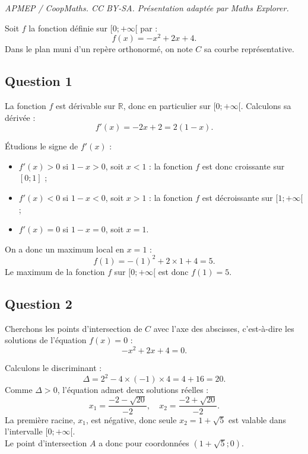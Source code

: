 \documentclass[10pt]{article}
\begin{document}
\noindent\textit{APMEP / CoopMaths. CC BY-SA. Présentation adaptée par Maths Explorer.}\par\medskip
Soit $f$ la fonction définie sur $[0 ; +\infty[$ par :
	\[
	f(x) = -x^2 + 2x + 4.
	\]
	Dans le plan muni d'un repère orthonormé, on note $C$ sa courbe représentative.
	
	\subsection*{Question 1}
	
	La fonction $f$ est dérivable sur $\mathbb{R}$, donc en particulier sur $[0 ; +\infty[$. Calculons sa dérivée :
	\[
	f'(x) = -2x + 2 = 2(1 - x).
	\]
	
	Étudions le signe de $f'(x)$ :
	\begin{itemize}
		\item $f'(x) > 0$ si $1 - x > 0$, soit $x < 1$ : la fonction $f$ est donc croissante sur $[0 ; 1]$ ;
		\item $f'(x) < 0$ si $1 - x < 0$, soit $x > 1$ : la fonction $f$ est décroissante sur $[1 ; +\infty[$ ;
		\item $f'(x) = 0$ si $1 - x = 0$, soit $x = 1$.
	\end{itemize}
	\begin{center}
	\end{center}
	On a donc un maximum local en $x = 1$ :
	\[
	f(1) = -(1)^2 + 2 \times 1 + 4 = 5.
	\]
	Le maximum de la fonction $f$ sur $[0 ; +\infty[$ est donc $f(1) = 5$.
	
	\subsection*{Question 2}
	
	Cherchons les points d'intersection de $C$ avec l'axe des abscisses, c'est-à-dire les solutions de l'équation $f(x) = 0$ :
	\[
	-x^2 + 2x + 4 = 0.
	\]
	
	Calculons le discriminant :
	\[
	\Delta = 2^2 - 4 \times (-1) \times 4 = 4 + 16 = 20.
	\]
	Comme $\Delta > 0$, l'équation admet deux solutions réelles :
	\[
	x_1 = \frac{-2 - \sqrt{20}}{-2}, \quad x_2 = \frac{-2 + \sqrt{20}}{-2}.
	\]
	La première racine, $x_1$, est négative, donc seule $x_2 = 1 + \sqrt{5}$ est valable dans l'intervalle $[0 ; +\infty[$.\\
	Le point d'intersection $A$ a donc pour coordonnées $(1 + \sqrt{5} ; 0)$.
	
\end{document}
